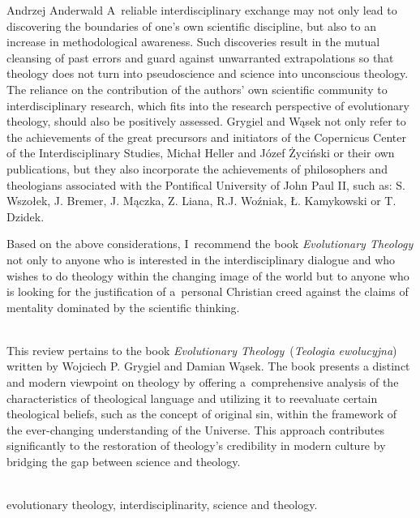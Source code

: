 \begin{newrevengenv}{Andrzej Anderwald}
A~reliable interdisciplinary exchange may not only lead to discovering the boundaries of one's own scientific discipline, but also to an increase in methodological awareness. Such discoveries result in the mutual cleansing of past errors and guard against unwarranted extrapolations so that theology does not turn into pseudoscience and science into unconscious theology. The reliance on the contribution of the authors' own scientific community to interdisciplinary research, which fits into the research perspective of evolutionary theology, should also be positively assessed. Grygiel and Wąsek not only refer to the achievements of the great precursors and initiators of the Copernicus Center of the Interdisciplinary Studies, Michał Heller and Józef Życiński or their own publications, but they also incorporate the achievements of philosophers and theologians associated with the Pontifical University of John Paul II, such as: S. Wszołek, J. Bremer, J. Mączka, Z. Liana, R.J. Woźniak, Ł. Kamykowski or T. Dzidek.



Based on the above considerations, I~recommend the book \textit{Evolutionary Theology} not only to anyone who is interested in the interdisciplinary dialogue and who wishes to do theology within the changing image of the world but to anyone who is looking for the justification of a~personal Christian creed against the claims of mentality dominated by the scientific thinking.



\vspace{15mm}%
{}\\
{This review pertains to the book \textit{Evolutionary Theology} (\textit{Teologia ewolucyjna}) written by Wojciech P. Grygiel and Damian Wąsek. The book presents a distinct and modern viewpoint on theology by offering a~comprehensive analysis of the characteristics of theological language and utilizing it to reevaluate certain theological beliefs, such as the concept of original sin, within the framework of the ever-changing understanding of the Universe. This approach contributes significantly to the restoration of theology's credibility in modern culture by bridging the gap between science and theology.}\par%
\vspace{2mm}%
{}\\
{evolutionary theology, interdisciplinarity, science and theology.}%



\end{newrevengenv}

